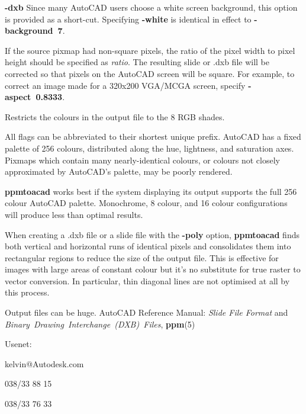 \begin{TPlist}{{\bf -dxb}}
Since many AutoCAD users choose a white screen background, this option
is provided as a short-cut.  Specifying
{\bf -white}
is identical in effect to
{\bf -background\ 7}{\rm .}
\item[{{\bf -aspect}{\it \ ratio}
}]
If the source pixmap had non-square pixels, the ratio of the pixel
width to pixel height should be specified as
{\it ratio}{\rm .}
The resulting slide or .dxb file will be corrected so that pixels on
the AutoCAD screen will be square.  For example, to correct an image made
for a 320x200 VGA/MCGA screen, specify
{\bf -aspect\ 0.8333}{\rm .}
\item[{{\bf -8}}]
Restricts the colours in the output file to the 8 RGB shades.
\end{TPlist}

\par
All flags can be abbreviated to their shortest unique prefix.
AutoCAD has a fixed palette of 256 colours, distributed along the hue,
lightness, and saturation axes.  Pixmaps which contain many
nearly-identical colours, or colours not closely approximated by
AutoCAD's palette, may be poorly rendered.
\par
{\bf ppmtoacad}
works best if the system displaying its output supports the full 256
colour AutoCAD palette.  Monochrome, 8 colour, and 16 colour
configurations will produce less than optimal results.
\par
When creating a .dxb file or a slide file with the
{\bf -poly}
option,
{\bf ppmtoacad}
finds both vertical and horizontal runs of identical pixels and
consolidates them into rectangular regions to reduce the size of the
output file.  This is effective for images with large areas of
constant colour but it's no substitute for true raster to vector
conversion.  In particular, thin diagonal lines are not optimised at
all by this process.
\par
Output files can be huge.
AutoCAD Reference Manual:
{\it Slide File Format}
and
{\it Binary\ Drawing\ Interchange\ (DXB)\ Files}{\rm ,}
{\bf ppm}{\rm (5)}
\begin{TPlist}{Usenet:}
\item[{Usenet:}]
kelvin@Autodesk.com
\item[{Fax:}]
038/33 88 15
\item[{Voice:}]
038/33 76 33
\end{TPlist}

